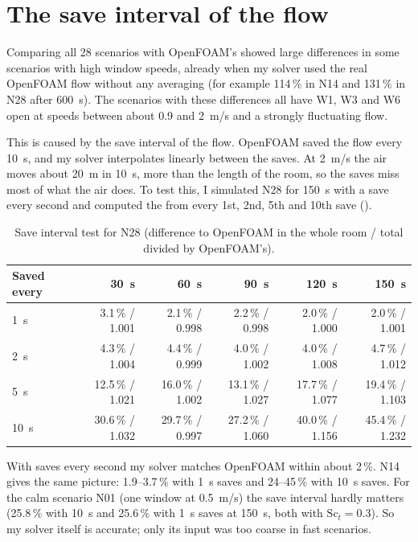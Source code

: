 \section{The save interval of the flow}
Comparing all 28 scenarios with OpenFOAM's \cotwo{} showed large differences in some scenarios with high
window speeds, already when my solver used the real OpenFOAM flow without any averaging (for example
114\,\% in N14 and 131\,\% in N28 after 600~s). The scenarios with these differences all have W1, W3 and W6 open
at speeds between about 0.9 and 2~m/s and a strongly fluctuating flow.

This is caused by the save interval of the flow. OpenFOAM saved the flow every 10~s, and my solver interpolates linearly
between the saves. At 2~m/s the air moves about 20~m in 10~s, more than the length of the room, so the saves
miss most of what the air does. To test this, I simulated N28 for 150~s with a save every second and computed
the \cotwo{} from every 1st, 2nd, 5th and 10th save ().

\begin{table}[h]
  \centering
  \caption[Save interval test for N28.]{Save interval test for N28 (difference to OpenFOAM in the whole
  room / total \cotwo{} divided by OpenFOAM's).}
  \label{tab:saves}
  \footnotesize
  \begin{tabular}{lrrrrr}
    \toprule
    Saved every & 30~s & 60~s & 90~s & 120~s & 150~s\\
    \midrule
    1~s  & 3.1\,\% / 1.001 & 2.1\,\% / 0.998 & 2.2\,\% / 0.998 & 2.0\,\% / 1.000 & 2.0\,\% / 1.001\\
    2~s  & 4.3\,\% / 1.004 & 4.4\,\% / 0.999 & 4.0\,\% / 1.002 & 4.0\,\% / 1.008 & 4.7\,\% / 1.012\\
    5~s  & 12.5\,\% / 1.021 & 16.0\,\% / 1.002 & 13.1\,\% / 1.027 & 17.7\,\% / 1.077 & 19.4\,\% / 1.103\\
    10~s & 30.6\,\% / 1.032 & 29.7\,\% / 0.997 & 27.2\,\% / 1.060 & 40.0\,\% / 1.156 & 45.4\,\% / 1.232\\
    \bottomrule
  \end{tabular}
\end{table}

With saves every second my solver matches OpenFOAM within about 2\,\%. N14 gives the same picture: 1.9--3.7\,\%
with 1~s saves and 24--45\,\% with 10~s saves. For the calm scenario N01 (one window at 0.5~m/s) the save
interval hardly matters (25.8\,\% with 10~s and 25.6\,\% with 1~s saves at 150~s, both with $\mathrm{Sc}_t=0.3$).
So my solver itself is accurate; only its input was too coarse in fast scenarios.


